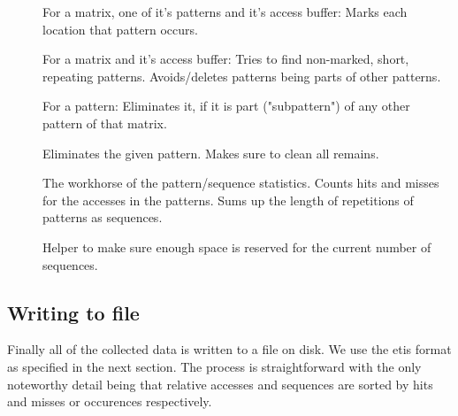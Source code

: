 \begin{description}
\item[] For a matrix, one of it's patterns and it's access buffer: Marks each location that pattern occurs.
\item[] For a matrix and it's access buffer: Tries to find non-marked, short, repeating patterns. Avoids/deletes patterns being parts of other patterns.
\item[] For a pattern: Eliminates it, if it is part ("subpattern") of any other pattern of that matrix.
\item[] Eliminates the given pattern. Makes sure to clean all remains.
\item[] The workhorse of the pattern/sequence statistics. Counts hits and misses for the accesses in the patterns. Sums up the length of repetitions of patterns as sequences.
\item[] Helper to make sure enough space is reserved for the current number of sequences.

\end{description}

\subsection{Writing to file}

Finally all of the collected data is written to a file on disk. We use the etis format as specified in the next section. The process is straightforward with the only noteworthy detail being that relative accesses and sequences are sorted by hits and misses or occurences respectively.
